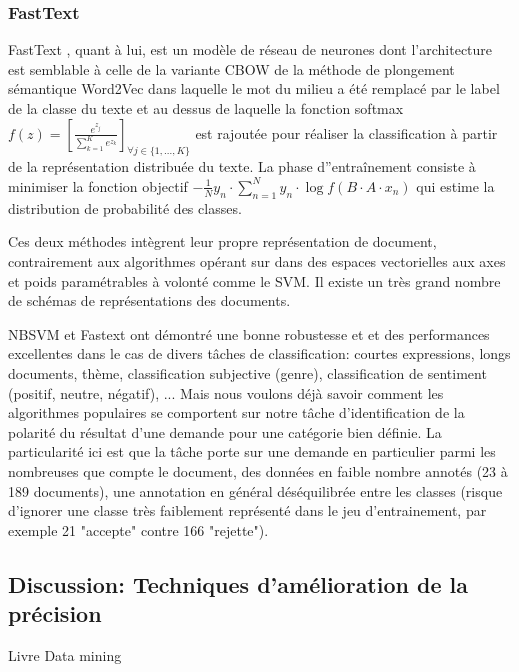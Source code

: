   
  \subsubsection{FastText}
  
 FastText \citep{grave2017fasttextcls}, quant à lui, est un modèle de réseau de neurones dont l'architecture est semblable à celle de la variante CBOW de la méthode de plongement sémantique Word2Vec dans laquelle le mot du milieu a été remplacé par le label de la classe du texte et au dessus de laquelle la fonction softmax $f(z) = \left[ \frac{e^{z_j}}{\sum\limits_{k=1}^K e^{z_k}} \right]_{\forall j \in \lbrace 1, ..., K \rbrace} $ est rajoutée pour réaliser la classification à partir de la représentation distribuée du texte. La phase d''entraînement consiste à minimiser la fonction objectif $-\frac{1}{N}y_n \cdot \sum\limits_{n=1}^N y_n \cdot \log{f(B\cdot A\cdot x_n)}$ qui estime la distribution de probabilité des classes.

Ces deux méthodes intègrent leur propre représentation de document, contrairement aux algorithmes opérant sur dans des espaces vectorielles aux axes et poids paramétrables à volonté comme le SVM. Il existe un très grand nombre de schémas de représentations des documents.

NBSVM et Fastext ont démontré une bonne robustesse et et des performances excellentes dans le cas de divers tâches de classification: courtes expressions, longs documents, thème, classification subjective (genre), classification de sentiment (positif, neutre, négatif), ... Mais nous voulons déjà savoir comment les algorithmes populaires se comportent sur notre tâche d'identification de la polarité du résultat d'une demande pour une catégorie bien définie. La particularité ici est que la tâche porte sur une demande en particulier parmi les nombreuses que compte le document, des données en faible nombre annotés (23 à 189 documents), une annotation en général déséquilibrée entre les classes (risque d'ignorer une classe très faiblement représenté dans le jeu d'entrainement, par exemple 21 "accepte" contre 166 "rejette").

\subsection{Discussion: Techniques d'amélioration de la précision}
Livre Data mining 

